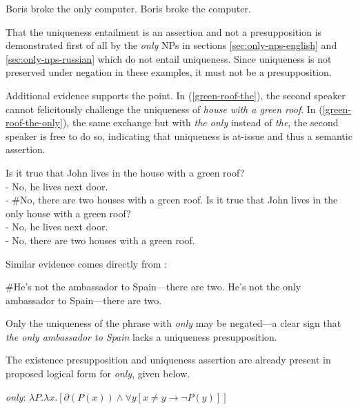 \begin{exe}
	\ex \label{feckless-boris} Boris broke the only computer.
	\ex \label{feckless-boris2} Boris broke the computer.
\end{exe}

That the uniqueness entailment is an assertion and not a presupposition is demonstrated first of all by the \textit{only} NPs in sections \ref{sec:only-nps-english} and \ref{sec:only-nps-russian} which do not entail uniqueness. Since uniqueness is not preserved under negation in these examples, it must not be a presupposition.

Additional evidence supports the point. In (\ref{green-roof-the}), the second speaker cannot felicitously challenge the uniqueness of \textit{house with a green roof}. In (\ref{green-roof-the-only}), the same exchange but with \textit{the only} instead of \textit{the}, the second speaker is free to do so, indicating that uniqueness is at-issue and thus a semantic assertion.

\begin{exe}
	\ex \label{green-roof-the} Is it true that John lives in the house with a green roof? \\
	    - No, he lives next door. \\
	    - \#No, there are two houses with a green roof.
	\ex \label{green-roof-the-only} Is it true that John lives in the only house with a green roof? \\
	    - No, he lives next door. \\
	    - No, there are two houses with a green roof.
\end{exe}

Similar evidence comes directly from \citet{cb2015}:

\begin{exe}
	\ex \#He's not the ambassador to Spain---there are two.
	\ex He's not the only ambassador to Spain---there are two.
\end{exe}

Only the uniqueness of the phrase with \textit{only} may be negated---a clear sign that \textit{the only ambassador to Spain} lacks a uniqueness presupposition.

The existence presupposition and uniqueness assertion are already present in  proposed logical form for \textit{only}, given below.

\begin{exe}
	\ex \label{only-lf} \textit{only}: $ \lambda P . \lambda x . [ \partial(P(x)) \land \forall y [ x \ne y \to \neg P(y) ] ] $
\end{exe}

